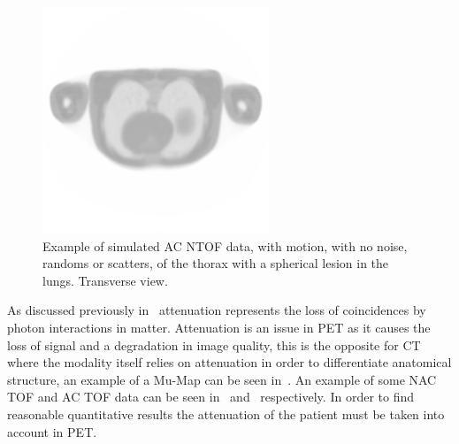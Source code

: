                 \begin{figure} %
                    \centering
                    
                    \includegraphics[width=1.0\linewidth]{figures/background_ac_example.png}
                    
                    \captionsetup{singlelinecheck=false, justification=raggedright}
                    \caption{Example of simulated \gls{AC} \gls{NTOF} data, with motion, with no noise, randoms or scatters, of the thorax with a spherical lesion in the lungs. Transverse view.} \label{fig:combined_pet_ct_ac_tof_example}
                \end{figure}
                
                As discussed previously in~ attenuation represents the loss of coincidences by photon interactions in matter. Attenuation is an issue in \gls{PET} as it causes the loss of signal and a degradation in image quality, this is the opposite for \gls{CT} where the modality itself relies on attenuation in order to differentiate anatomical structure, an example of a \gls{Mu-Map} can be seen in~. An example of some \gls{NAC} \gls{TOF} and \gls{AC} \gls{TOF} data can be seen in~ and~ respectively. In order to find reasonable quantitative results the attenuation of the patient must be taken into account in \gls{PET}. %
                
